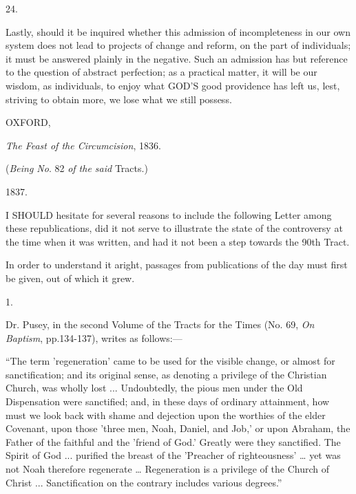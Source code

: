 24.

Lastly, should it be inquired whether this
admission of incompleteness in our own system does not lead to
projects of change and reform, on the part of individuals; it must
be answered plainly in the negative. Such an admission has but
reference to the question of abstract perfection; as a practical
matter, it will be our wisdom, as individuals, to enjoy what GOD'S
good providence has left us, lest, striving to obtain more, we lose
what we still possess.

OXFORD,

\emph{The Feast of the Circumcision}, 1836.




(\emph{Being
No}. 82 \emph{of the said} Tracts.)

1837.


I SHOULD
hesitate for several reasons to include the following Letter among
these republications, did it not serve to illustrate the state of the
controversy at the time when it was written, and had it not been a
step towards the 90th Tract.

In order to understand it aright, passages from
publications of the day must first be given, out of which it grew.

1.

Dr. Pusey, in the second Volume of the Tracts for
the Times (No. 69, \emph{On\textbf{ }}\emph{Baptism}, pp.\emph{}134-137), writes
as follows:—

``The term 'regeneration' came to be used for the
visible change, or almost for sanctification; and its original sense,
as denoting a privilege of the Christian Church, was wholly lost ...
Undoubtedly, the pious men under the Old Dispensation were sanctified;
and, in these days of ordinary attainment, how must we look back with
shame and dejection upon the worthies of the elder Covenant, upon those 'three men, Noah, Daniel, and Job,' or upon Abraham, the
Father of the faithful and the 'friend of God.' Greatly were they
sanctified. The Spirit of God ... purified the breast of the
'Preacher of righteousness' … yet was not Noah therefore regenerate
… Regeneration is a privilege of the Church of Christ ...
Sanctification on the contrary includes various degrees.''

